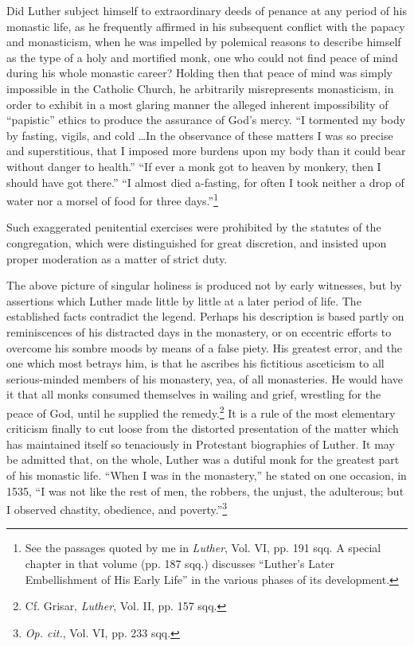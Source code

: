 Did Luther subject himself to extraordinary deeds of penance at
any period of his monastic life, as he frequently affirmed in his subsequent
conflict with the papacy and monasticism, when he was impelled
by polemical reasons to describe himself as the type of a
holy and mortified monk, one who could not find peace of mind
during his whole monastic career? Holding then that peace of mind
was simply impossible in the Catholic Church, he arbitrarily misrepresents
monasticism, in order to exhibit in a most glaring manner
the alleged inherent impossibility of “papistic” ethics to produce the
assurance of God’s mercy. “I tormented my body by fasting, vigils,
and cold \dots In the observance of these matters I was so precise
and superstitious, that I imposed more burdens upon my body than
it could bear without danger to health.” “If ever a monk got to
heaven by monkery, then I should have got there.” “I almost died
a-fasting, for often I took neither a drop of water nor a morsel
of food for three days.”\footnote
{See the passages quoted by me in \textit{Luther}, Vol. VI, pp. 191 sqq. A special chapter in that
volume (pp. 187 sqq.) discusses “Luther’s Later Embellishment of His Early Life” in the
various phases of its development.}

Such exaggerated penitential exercises were prohibited by the
statutes of the congregation, which were distinguished for great discretion,
and insisted upon proper moderation as a matter of strict
duty.

The above picture of singular holiness is produced not by early
witnesses, but by assertions which Luther made little by little at a
later period of life. The established facts contradict the legend. Perhaps
his description is based partly on reminiscences of his distracted
days in the monastery, or on eccentric efforts to overcome his sombre
moods by means of a false piety. His greatest error, and the one
which most betrays him, is that he ascribes his fictitious asceticism
to all serious-minded members of his monastery, yea, of all monasteries.
He would have it that all monks consumed themselves in
wailing and grief, wrestling for the peace of God, until he supplied
the remedy.\footnote{Cf. Grisar, \textit{Luther}, Vol. II, pp. 157 sqq.}
It is a rule of the most elementary criticism finally to
cut loose from the distorted presentation of the matter which has
maintained itself so tenaciously in Protestant biographies of Luther.
It may be admitted that, on the whole, Luther was a dutiful monk
for the greatest part of his monastic life. “When I was in the monastery,”
he stated on one occasion, in 1535, “I was not like the rest
of men, the robbers, the unjust, the adulterous; but I observed chastity,
obedience, and poverty.”\footnote{\textit{Op. cit.}, Vol. VI, pp. 233 sqq.}

